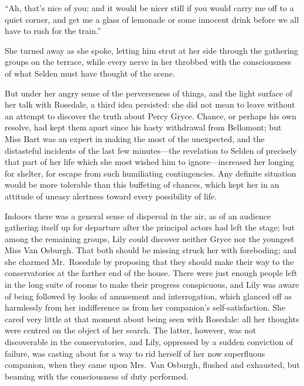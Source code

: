 \documentclass[12pt,a4paper]{book}
\begin{document}
``Ah, that's nice of you; and it would be nicer still if you would
carry me off to a quiet corner, and get me a glass of lemonade or
some innocent drink before we all have to rush for the train.''





She turned away as she spoke, letting him strut at her side
through the gathering groups on the terrace, while every nerve in
her throbbed with the consciousness of what Selden must have
thought of the scene.





But under her angry sense of the perverseness of things, and the
light surface of her talk with Rosedale, a third idea persisted: 
she did not mean to leave without an attempt to discover the
truth about Percy Gryce. Chance, or perhaps his own resolve, had
kept them apart since his hasty withdrawal from Bellomont; but
Miss Bart was an expert in making the most of the unexpected, and
the distasteful incidents of the last few minutes---the revelation
to Selden of precisely that part of her life which she most
wished him to ignore---increased her longing for shelter, for
escape from such humiliating contingencies. Any definite
situation would be more tolerable than this buffeting of chances,
which kept her in an attitude of uneasy alertness toward every
possibility of life.





Indoors there was a general sense of dispersal in the air, as of
an audience gathering itself up for departure after the principal
actors had left the stage; but among the remaining groups, Lily
could discover neither Gryce nor the youngest Miss Van Osburgh. 
That both should be missing struck her with foreboding; and she
charmed Mr.\ Rosedale by proposing that they should make their way
to the conservatories at the farther end of the house. There were
just enough people left in the long suite of rooms to make their
progress conspicuous, and Lily was aware of being followed
by looks of amusement and interrogation, which glanced off as
harmlessly from her indifference as from her companion's
self-satisfaction. She cared very little at that moment about
being seen with Rosedale: all her thoughts were centred on the
object of her search. The latter, however, was not discoverable
in the conservatories, and Lily, oppressed by a sudden conviction
of failure, was casting about for a way to rid herself of her now
superfluous companion, when they came upon Mrs.\ Van Osburgh,
flushed and exhausted, but beaming with the consciousness of duty
performed.
\end{document}
